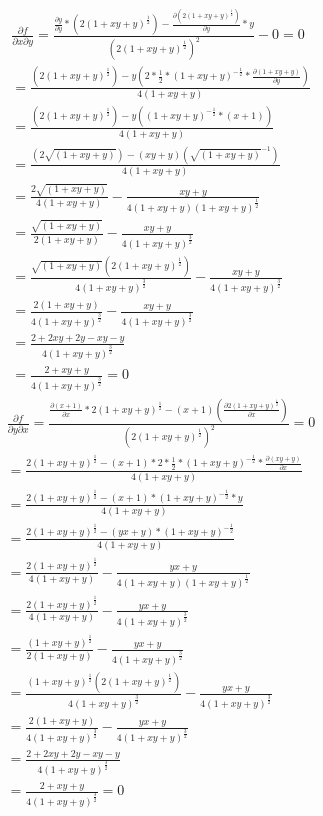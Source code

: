 \documentclass{article}
\begin{document}
\begin{align*}
    \frac{\partial f}{\partial x \partial y}=\frac{\frac{\partial y}{\partial y}*(2(1+xy+y)^{\frac{1}{2}})-\frac{\partial (2(1+xy+y)^{\frac{1}{2}})}{\partial y}*y}{(2(1+xy+y)^{\frac{1}{2}})^2} - 0 =0\\
    = \frac{(2(1+xy+y)^{\frac{1}{2}}) - y(2*\frac{1}{2}*(1+xy+y)^{-\frac{1}{2}}*\frac{\partial (1+xy+y)}{\partial y})}{4(1+xy+y)} \\
    = \frac{(2(1+xy+y)^{\frac{1}{2}}) - y((1+xy+y)^{-\frac{1}{2}}*(x+1))}{4(1+xy+y)} \\
    = \frac{(2\sqrt{(1+xy+y)}) - (xy+y)(\sqrt{(1+xy+y)}^{-1})}{4(1+xy+y)} \\
    = \frac{2\sqrt{(1+xy+y)}}{4(1+xy+y)} - \frac{xy+y}{4(1+xy+y)(1+xy+y)^{\frac{1}{2}}} \\
    = \frac{\sqrt{(1+xy+y)}}{2(1+xy+y)} - \frac{xy+y}{4(1+xy+y)^{\frac{3}{2}}} \\
    = \frac{\sqrt{(1+xy+y)}(2(1+xy+y)^{\frac{1}{2}})}{4(1+xy+y)^{\frac{3}{2}}} - \frac{xy+y}{4(1+xy+y)^{\frac{3}{2}}} \\
    = \frac{2(1+xy+y)}{4(1+xy+y)^{\frac{3}{2}}} -\frac{xy+y}{4(1+xy+y)^{\frac{3}{2}}} \\
    = \frac{2+2xy+2y-xy-y}{4(1+xy+y)^{\frac{3}{2}}} \\
    = \frac{2+xy+y}{4(1+xy+y)^{\frac{3}{2}}}=0
\end{align*}
\begin{align*}
    \frac{\partial f}{\partial y\partial x}=\frac{\frac{\partial (x+1)}{\partial x}*2(1+xy+y)^{\frac{1}{2}}-(x+1)(\frac{\partial 2(1+xy+y)^{\frac{1}{2}}}{\partial x})}{(2(1+xy+y)^{\frac{1}{2}})^2} =0\\
    = \frac{2(1+xy+y)^{\frac{1}{2}} - (x+1)*2*\frac{1}{2}*(1+xy+y)^{-\frac{1}{2}}*\frac{\partial (xy+y)}{\partial x}}{4(1+xy+y)} \\
    = \frac{2(1+xy+y)^{\frac{1}{2}} - (x+1)*(1+xy+y)^{-\frac{1}{2}}* y}{4(1+xy+y)} \\
    = \frac{2(1+xy+y)^{\frac{1}{2}} - (yx+y)*(1+xy+y)^{-\frac{1}{2}}}{4(1+xy+y)} \\
    = \frac{2(1+xy+y)^{\frac{1}{2}}}{4(1+xy+y)} - \frac{yx+y}{4(1+xy+y)(1+xy+y)^{\frac{1}{2}}} \\
    = \frac{2(1+xy+y)^{\frac{1}{2}}}{4(1+xy+y)} - \frac{yx+y}{4(1+xy+y)^{\frac{3}{2}}} \\
    = \frac{(1+xy+y)^{\frac{1}{2}}}{2(1+xy+y)} - \frac{yx+y}{4(1+xy+y)^{\frac{3}{2}}} \\
    = \frac{(1+xy+y)^{\frac{1}{2}}(2(1+xy+y)^{\frac{1}{2}})}{4(1+xy+y)^{\frac{3}{2}}} - \frac{yx+y}{4(1+xy+y)^{\frac{3}{2}}} \\
    = \frac{2(1+xy+y)}{4(1+xy+y)^{\frac{3}{2}}} - \frac{yx+y}{4(1+xy+y)^{\frac{3}{2}}} \\
    = \frac{2+2xy+2y -xy -y}{4(1+xy+y)^{\frac{3}{2}}} \\
    = \frac{2+xy+y}{4(1+xy+y)^{\frac{3}{2}}}=0 
\end{align*}
\end{document}
